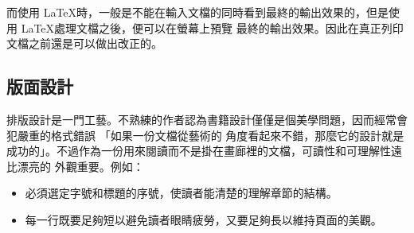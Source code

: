 
而使用 \LaTeX 時，一般是不能在輸入文檔的同時看到最終的輸出效果的，但是使用 \LaTeX 處理文檔之後，便可以在螢幕上預覽
最終的輸出效果。因此在真正列印文檔之前還是可以做出改正的。

\subsection{版面設計}


排版設計是一門工藝。不熟練的作者認為書籍設計僅僅是個美學問題，因而經常會犯嚴重的格式錯誤 \pozhehao 「如果一份文檔從藝術的
角度看起來不錯，那麼它的設計就是成功的」。不過作為一份用來閱讀而不是掛在畫廊裡的文檔，可讀性和可理解性遠比漂亮的
外觀重要。例如：
\begin{itemize}
\item 必須選定字號和標題的序號，使讀者能清楚的理解章節的結構。
\item
每一行既要足夠短以避免讀者眼睛疲勞，又要足夠長以維持頁面的美觀。
\end{itemize}


